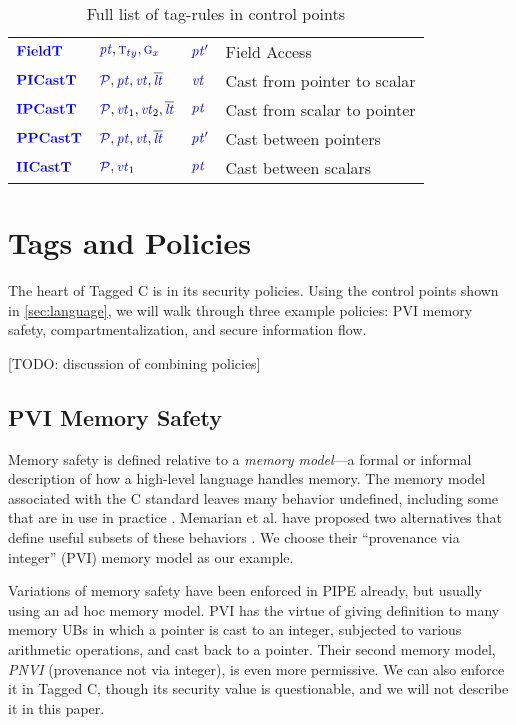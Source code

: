 \documentclass{llncs}
\begin{document}
\begin{table}[t]
\begin{tabular}{|l|l|l|l|}
    \(\color{blue} \mathbf{FieldT}\)     & \(\mathit{\color{blue} pt}, {\color{blue} \textnormal{\sc t}_{ty}}, {\color{blue} \textnormal{\sc g}_{x}}\)        & \(\mathit{\color{blue} pt}'\)     & Field Access \\
    \(\color{blue} \mathbf{PICastT}\)    & \(\mathcal{\color{blue} P}, \mathit{\color{blue} pt}, \mathit{\color{blue} vt}, \overline{\mathit{\color{blue} lt}}\)       & \(\mathit{\color{blue} vt}\)    & Cast from pointer to scalar \\
    \(\color{blue} \mathbf{IPCastT}\)    & \(\mathcal{\color{blue} P}, \mathit{\color{blue} vt}_1, \mathit{\color{blue} vt}_2, \overline{\mathit{\color{blue} lt}}\)       & \(\mathit{\color{blue} pt}\)    & Cast from scalar to pointer \\
    \(\color{blue} \mathbf{PPCastT}\)    & \(\mathcal{\color{blue} P}, \mathit{\color{blue} pt}, \mathit{\color{blue} vt}, \overline{\mathit{\color{blue} lt}}\)       & \(\mathit{\color{blue} pt}'\)    & Cast between pointers \\
    \(\color{blue} \mathbf{IICastT}\)    & \(\mathcal{\color{blue} P}, \mathit{\color{blue} vt}_1\)       & \(\mathit{\color{blue} pt}\)    & Cast between scalars \\
    \hline
  \end{tabular}

  \caption{Full list of tag-rules in control points}
  \label{fig:controlpoints}
\end{table}


\section{Tags and Policies}
\label{sec:policies}

The heart of Tagged C is in its security policies. Using the control points shown in \cref{sec:language},
we will walk through three example policies: PVI memory safety, compartmentalization, and
secure information flow.

[TODO: discussion of combining policies]

\subsection{PVI Memory Safety}
\label{sec:PVI}

Memory safety is defined relative to a {\em memory model}---a formal or informal description of
how a high-level language handles memory. The memory model associated with the C standard leaves
many behavior undefined, including some that are in use in practice \cite{Memarian16:DeFacto}.
Memarian et al. have proposed two alternatives that define useful subsets of these behaviors
\cite{Memarian19:ExploringCSemantics}. We choose their ``provenance via integer'' (PVI) memory model
as our example. 

Variations of memory safety have been enforced in PIPE already, but usually using
an ad hoc memory model. PVI has the virtue of giving definition to many memory UBs in which a pointer is
cast to an integer, subjected to various arithmetic operations, and cast back to a pointer.
Their second memory model, {\it PNVI} (provenance not via integer), is even more permissive.
We can also enforce it in Tagged C, though its security value is questionable, and we will
not describe it in this paper.
\end{document}
